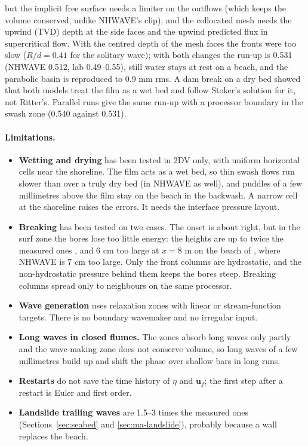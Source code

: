\begin{itemize}[nosep]
        but the implicit free surface needs a limiter on the outflows (which
        keeps the volume conserved, unlike NHWAVE's clip), and the collocated
        mesh needs the upwind (TVD) depth at the side faces and the upwind
        predicted flux in supercritical flow. With the centred depth of the
        mesh faces the fronts were too slow ($R/d = 0.41$ for the solitary
        wave); with both changes the run-up is 0.531 (NHWAVE 0.512, lab
        0.49--0.55), still water stays at rest on a beach, and the
        parabolic basin is reproduced to 0.9 mm rms. A dam break on a dry
        bed showed that both models treat the film as a wet bed and follow
        Stoker's solution for it, not Ritter's. Parallel runs give the same
        run-up with a processor boundary in the swash zone (0.540 against
        0.531).
\end{itemize}

\paragraph{Limitations.}
\begin{itemize}[nosep]
  \item \textbf{Wetting and drying} has been tested in 2DV only, with uniform
        horizontal cells near the shoreline. The film acts as a wet bed, so
        thin swash flows run slower than over a truly dry bed (in NHWAVE as
        well), and puddles of a few millimetres above the film stay on the
        beach in the backwash. A narrow cell at the shoreline raises the
        errors. It needs the interface pressure layout.
  \item \textbf{Breaking} has been tested on two cases. The onset is about
        right, but in the surf zone the bores lose too little energy: the
        heights are up to twice the measured ones \citep{hansen1979}, and
        6 cm too large at $x = 8$ m on the beach of \citet{ting1994}, where
        NHWAVE is 7 cm too large. Only the front columns are hydrostatic, and
        the non-hydrostatic pressure behind them keeps the bores steep.
        Breaking columns spread only to neighbours on the same processor.
  \item \textbf{Wave generation} uses relaxation zones with linear or
        stream-function targets. There is no boundary wavemaker and no
        irregular input.
  \item \textbf{Long waves in closed flumes.} The zones absorb long waves only
        partly and the wave-making zone does not conserve volume, so long waves
        of a few millimetres build up and shift the phase over shallow bars in
        long runs.
  \item \textbf{Restarts} do not save the time history of $\eta$ and
        $\bm{u}_f$; the first step after a restart is Euler and first order.
  \item \textbf{Landslide trailing waves} are 1.5--3 times the measured ones
        (Sections~\ref{sec:seabed} and \ref{sec:ma-landslide}), probably
        because a wall replaces the beach.
\end{itemize}

